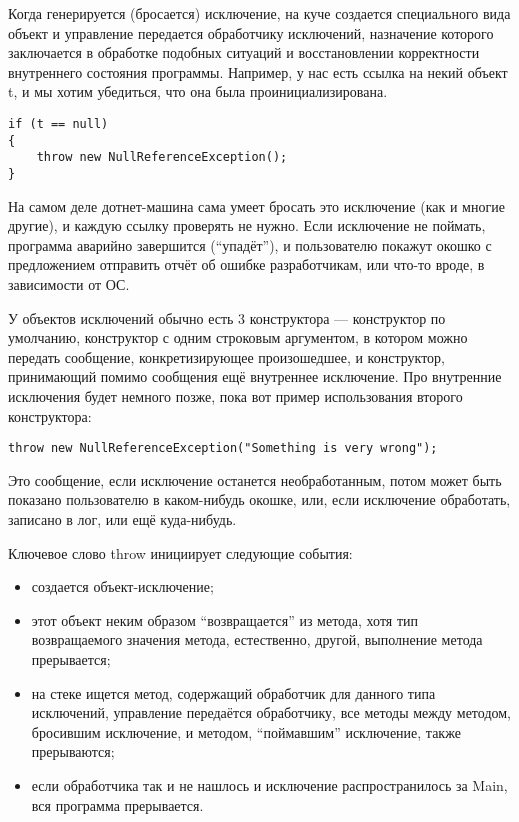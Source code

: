 \documentclass[a5paper]{article}
\begin{document}
Когда генерируется (бросается) исключение, на куче создается специального вида объект и управление передается обработчику исключений, назначение которого заключается в обработке подобных ситуаций и восстановлении корректности внутреннего состояния программы. Например, у нас есть ссылка на некий объект t, и мы хотим убедиться, что она была проинициализирована.

\begin{verbatim}
if (t == null)
{
    throw new NullReferenceException();
}
\end{verbatim}

На самом деле дотнет-машина сама умеет бросать это исключение (как и многие другие), и каждую ссылку проверять не нужно. Если исключение не поймать, программа аварийно завершится (``упадёт''), и пользователю покажут окошко с предложением отправить отчёт об ошибке разработчикам, или что-то вроде, в зависимости от ОС. 

У объектов исключений обычно есть 3 конструктора --- конструктор по умолчанию, конструктор с одним строковым аргументом, в котором можно передать сообщение, конкретизирующее произошедшее, и конструктор, принимающий помимо сообщения ещё внутреннее исключение. Про внутренние исключения будет немного позже, пока вот пример использования второго конструктора:

\begin{verbatim}
throw new NullReferenceException("Something is very wrong");
\end{verbatim}

Это сообщение, если исключение останется необработанным, потом может быть показано пользователю в каком-нибудь окошке, или, если исключение обработать, записано в лог, или ещё куда-нибудь.

Ключевое слово throw инициирует следующие события:

\begin{itemize}
    \item создается объект-исключение;
    \item этот объект неким образом ``возвращается'' из метода, хотя тип возвращаемого значения метода, естественно, другой, выполнение метода прерывается;
    \item на стеке ищется метод, содержащий обработчик для данного типа исключений, управление передаётся обработчику, все методы между методом, бросившим исключение, и методом, ``поймавшим'' исключение, также прерываются;
    \item если обработчика так и не нашлось и исключение распространилось за Main, вся программа прерывается.
\end{itemize}
\end{document}
